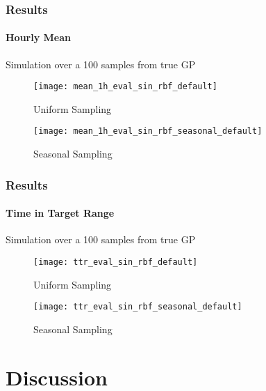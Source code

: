 \documentclass[
	8pt, %
]{beamer}
\begin{document}
\begin{frame}
	\frametitle{Results}
	\framesubtitle{Hourly Mean} %

	Simulation over a 100 samples from true GP

	\begin{figure}
			\texttt{[image: mean\_1h\_eval\_sin\_rbf\_default]}
			\caption{Uniform Sampling}
	\end{figure}

	\begin{figure}
			\texttt{[image: mean\_1h\_eval\_sin\_rbf\_seasonal\_default]}
			\caption{Seasonal Sampling}
	\end{figure}

\end{frame}


\begin{frame}
	\frametitle{Results}
	\framesubtitle{Time in Target Range} %

	Simulation over a 100 samples from true GP

	\begin{figure}
			\texttt{[image: ttr\_eval\_sin\_rbf\_default]}
			\caption{Uniform Sampling}
	\end{figure}

	\begin{figure}
			\texttt{[image: ttr\_eval\_sin\_rbf\_seasonal\_default]}
			\caption{Seasonal Sampling}
	\end{figure}

\end{frame}


\section{Discussion}
\end{document}
